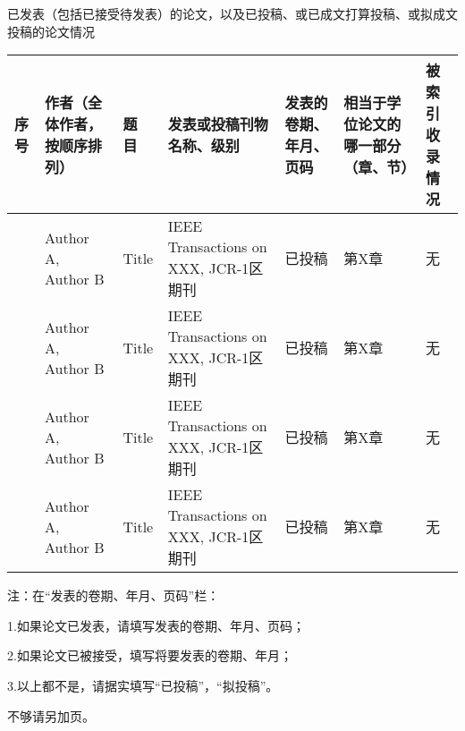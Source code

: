 
\begin{resume}[name={攻读博士学位期间取得的研究成果}]

  已发表（包括已接受待发表）的论文，以及已投稿、或已成文打算投稿、或拟成文投稿的论文情况\textbf{}
  \begin{table}
    \centering{}%
    \small 
    \begin{tabular}{|>{\centering}m{0.5cm}|>{\centering}m{2.3cm}|>{\centering}m{3.2cm}|>{\centering}m{2.8cm}|>{\centering}m{1.5cm}|>{\centering}m{1.5cm}|>{\centering}m{1cm}|}
      \hline 
      序号 & 作者（全体作者，按顺序排列） & 题 \quad 目 						   & 发表或投稿刊物名称、级别 & 发表的卷期、年月、页码 & 相当于学位论文的哪一部分（章、节） & 被索引收录情况\tabularnewline
      \hline 
      1    & Author A, Author B 	  & Title & IEEE Transactions on XXX, JCR-1区期刊  & 已投稿 & 第X章& 无    \tabularnewline
      \hline 
      2    & Author A, Author B 	  & Title & IEEE Transactions on XXX, JCR-1区期刊  & 已投稿 & 第X章& 无    \tabularnewline
      \hline 
      3    & Author A, Author B 	  & Title & IEEE Transactions on XXX, JCR-1区期刊  & 已投稿 & 第X章& 无    \tabularnewline
      \hline 
      4    & Author A, Author B 	  & Title & IEEE Transactions on XXX, JCR-1区期刊  & 已投稿 & 第X章& 无    \tabularnewline
      \hline 

    \end{tabular}
  \end{table}
  
  注：在“发表的卷期、年月、页码”栏：
  
  1.如果论文已发表，请填写发表的卷期、年月、页码；
  
  2.如果论文已被接受，填写将要发表的卷期、年月；
  
  3.以上都不是，请据实填写“已投稿”，“拟投稿”。
  
  不够请另加页。
  

\end{resume}


